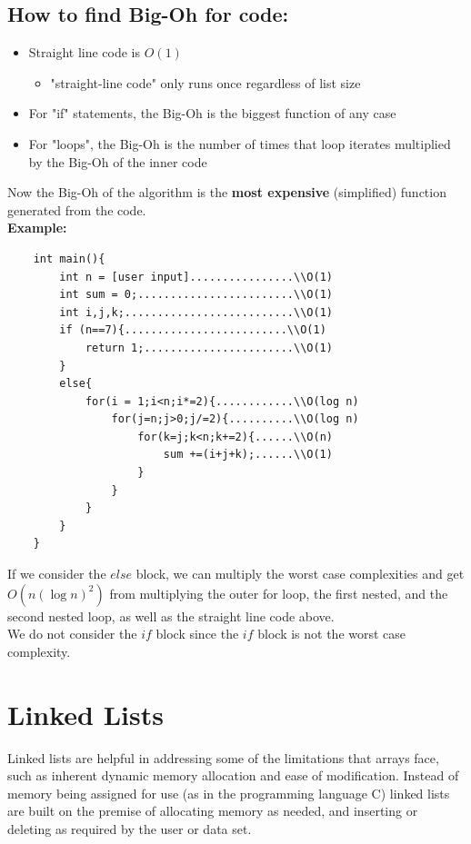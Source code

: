 \documentclass[hidelinks,11pt]{article}
\begin{document}
\subsection{How to find Big-Oh for code:}
\begin{itemize}
    \item Straight line code is $O(1)$ 
    \begin{itemize}
        \item "straight-line code" only runs once regardless of list size
    \end{itemize}
    \item For "if" statements, the Big-Oh is the biggest function of any case
    \item For "loops", the Big-Oh is the number of times that loop iterates multiplied by the Big-Oh of the inner code
\end{itemize}
Now the Big-Oh of the algorithm is the \textbf{most expensive} (simplified) function generated from the code.\\[.5\baselineskip]
\textbf{Example:}
\begin{lstlisting}
    int main(){
        int n = [user input]................\\O(1)
        int sum = 0;........................\\O(1)
        int i,j,k;..........................\\O(1)
        if (n==7){.........................\\O(1)
            return 1;.......................\\O(1)
        }
        else{ 
            for(i = 1;i<n;i*=2){............\\O(log n)
                for(j=n;j>0;j/=2){..........\\O(log n)
                    for(k=j;k<n;k+=2){......\\O(n)
                        sum +=(i+j+k);......\\O(1)
                    }
                }
            }
        }
    }
\end{lstlisting}
If we consider the $else$ block, we can multiply the worst case complexities and get $O(n(\log n)^2)$ from multiplying the outer for loop, the first nested, and the second nested loop, as well as the straight line code above.\\[0.5\baselineskip]
We do not consider the $if$ block since the $if$ block is not the worst case complexity.
\section{Linked Lists}
Linked lists are helpful in addressing some of the limitations that arrays face, such as inherent dynamic memory allocation and ease of modification. Instead of memory being assigned for use (as in the programming language C) linked lists are built on the premise of allocating memory as needed, and inserting or deleting as required by the user or data set.
\end{document}
